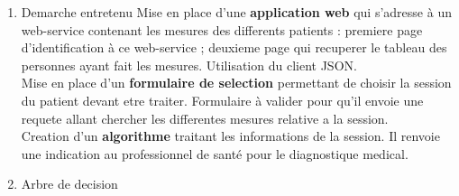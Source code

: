 \begin{enumerate}

	\item{Demarche entretenu}
Mise en place d'une \textbf{application web} qui s'adresse à un web-service contenant les mesures des differents patients : premiere page d'identification à ce web-service ; deuxieme page qui recuperer le tableau des personnes ayant fait les mesures. Utilisation du client JSON. \\
Mise en place d'un \textbf{formulaire de selection} permettant de choisir la session du patient devant etre traiter. Formulaire à valider pour qu'il envoie une requete allant chercher les differentes mesures relative a la session. \\
Creation d'un \textbf{algorithme} traitant les informations de la session. Il renvoie une indication au professionnel de santé pour le diagnostique medical.

	\item{Arbre de decision}


\end{enumerate}

